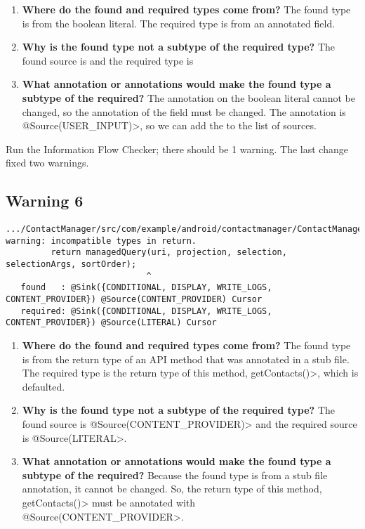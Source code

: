  \begin{enumerate}

\item\textbf{Where do the found and required types come from?}
   The found type is from the boolean literal.  The required type is from an annotated field.
  \item\textbf{ Why is the found type not a subtype of the required type?}
  The found source is  and the required type is 
  \item\textbf{What annotation or annotations would make the found type a subtype of the required?}
  The annotation on the boolean literal cannot be changed, so the annotation of the field must be changed.  The annotation is \<@Source(USER\_INPUT)>, so we can add the 
   to the list of sources.\newline
  
      \end{enumerate}

    Run the Information Flow Checker; there should be 1 warning.  The last change fixed two warnings.
    
  \subsection{Warning 6}
   \begin{Verbatim}
.../ContactManager/src/com/example/android/contactmanager/ContactManager.java:118: 
warning: incompatible types in return.
         return managedQuery(uri, projection, selection, selectionArgs, sortOrder);
                            ^
   found   : @Sink({CONDITIONAL, DISPLAY, WRITE_LOGS, CONTENT_PROVIDER}) @Source(CONTENT_PROVIDER) Cursor
   required: @Sink({CONDITIONAL, DISPLAY, WRITE_LOGS, CONTENT_PROVIDER}) @Source(LITERAL) Cursor
    \end{Verbatim} 

 \begin{enumerate}

\item\textbf{Where do the found and required types come from?}
   The found type is from the return type of an API method that was annotated in a stub file.  The required type is the return type of this method, \<getContacts()>, which is defaulted. 
  \item\textbf{ Why is the found type not a subtype of the required type?}
  The found source is \<@Source(CONTENT\_PROVIDER)> and the required source is 
  \<@Source(LITERAL>.
  \item\textbf{What annotation or annotations would make the found type a subtype of the required?}
  Because the found type is from a stub file annotation, it cannot be changed. So, the return type of this method, \<getContacts()> must be annotated with 
  \<@Source(CONTENT\_PROVIDER>.\newline
  
              \end{enumerate}

